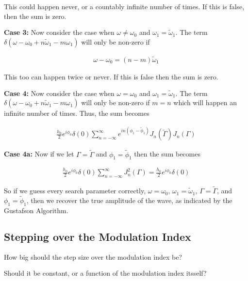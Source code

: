 \documentclass[onecolumn, groupedaddress, 10pt]{revtex4-1}
\begin{document}
This could happen never, or a countably infinite number of times.  If this is false, then the sum is zero.


\textbf{Case 3:}  Now consider the case when $\omega \neq \omega_0$ and $\omega_1 = \widetilde{\omega}_1$.  The term $\delta(\omega - \omega_0 + n\widetilde{\omega}_1 - m\omega_1)$ will only be non-zero if

\begin{align}
\omega - \omega_0 = (n-m)\widetilde{\omega}_1
\end{align}

This too can happen twice or never.  If this is false then the sum is zero.

\textbf{Case 4:}  Now consider the case when $\omega = \omega_0$ and $\omega_1 = \widetilde{\omega}_1$.  The term $\delta(\omega - \omega_0 + n\widetilde{\omega}_1 - m\omega_1)$ will only be non-zero if $m=n$ which will happen an infinite number of times.  Thus, the sum becomes

\begin{align}
\frac{h_0}{2} e^{i\phi_0} \delta(0) \sum_{n=-\infty}^{\infty} e^{in(\phi_1-\widetilde{\phi}_1)} J_n(\widetilde{\Gamma}) J_n (\Gamma)
\end{align}

\textbf{Case 4a:} Now if we let $\Gamma = \widetilde{\Gamma}$ and $\phi_1 = \widetilde{\phi}_1$ then the sum becomes

\begin{align}
\frac{h_0}{2} e^{i\phi_0} \delta(0) \sum_{n=-\infty}^{\infty} J_n^2 (\Gamma) = \frac{h_0}{2} e^{i\phi_0} \delta(0)
\end{align}

So if we guess every search parameter correctly, $\omega = \omega_0$, $\omega_1 = \widetilde{\omega}_1$, $\Gamma = \widetilde{\Gamma}$, and $\phi_1 = \widetilde{\phi}_1$, then we recover the true amplitude of the wave, as indicated by the Gustafson Algorithm. 


\subsection{Stepping over the Modulation Index}
How big should the step size over the modulation index be?

Should it be constant, or a function of the modulation index itsself?
\end{document}
